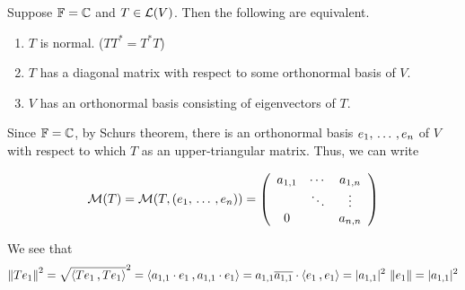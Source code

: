 \begin{thm}
  Suppose $\mathbb{F} = \mathbb{C}$ and $T \in \mathcal{L}(V)$. Then the following are equivalent.
  \begin{enumerate}[label=\textbf{(\alph*)}]
    \item $T$ is normal. ($TT^* = T^*T$)
    \item $T$ has a diagonal matrix with respect to some orthonormal basis of $V$.
    \item $V$ has an orthonormal basis consisting of eigenvectors of $T$.
  \end{enumerate}
\end{thm}
\begin{prf}
  Since $\mathbb{F}=\mathbb{C}$, by Schurs theorem, there is an orthonormal basis $e_1, {\, \ldots \,\,}, e_n$ of $V$ with respect to which $T$ as an upper-triangular matrix. Thus, we can write

  \begin{equation}
    \label{eq: mmatrix T, e1...en}
    \mathcal{M}(T) = \mathcal{M} (T, (e_1, {\, \ldots \,\,}, e_n)) =
    \left(
    \begin{array}{ccc}
      a_{1,1} & \cdots & a_{1,n} \\
      & \ddots & \vdots \\
      0     &        & a_{n,n} \\
    \end{array}
    \right)
  \end{equation}

  We see that
  \[
  \norm{T e_1}^2 = \sqrt{\ip{Te_1}{Te_1}}^2
  = \ip{a_{1,1}\cdot e_1}{a_{1,1}\cdot e_1}
  = a_{1,1} \overline{a_{1,1}} \cdot  \ip{e_1}{e_1}
  = |a_{1,1}|^2 \, \norm{e_1} = |a_{1,1}|^2
  \]


\end{prf}
